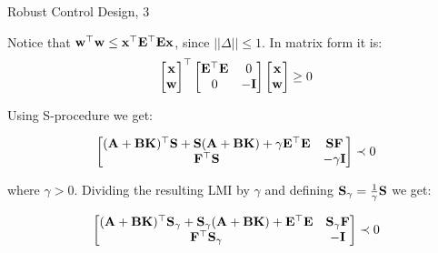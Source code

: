 \documentclass{beamer}
\begin{document}
\begin{frame}{Robust Control Design, 3}
	\begin{flushleft}
		
		
		Notice that $\mathbf{w}^\top\mathbf{w} \leq \mathbf{x}^\top \mathbf{E}^\top \mathbf{E} \mathbf{x}$, since $|| \Delta || \leq 1$. In matrix form it is:
		\begin{equation}
			\begin{bmatrix}
				\mathbf{x} \\ \mathbf{w}
			\end{bmatrix}^\top
			\begin{bmatrix}
				\mathbf{E}^\top \mathbf{E} & 0 \\
				0 & -\mathbf{I}
			\end{bmatrix}
			\begin{bmatrix}
				\mathbf{x} \\ \mathbf{w}
			\end{bmatrix} \geq 0
		\end{equation}
		
		Using S-procedure we get:
		
		\begin{equation}
			\begin{bmatrix}
				(\mathbf{A} + \mathbf{B}\mathbf{K})^\top\mathbf{S} + \mathbf{S} (\mathbf{A} + \mathbf{B}\mathbf{K}) + \gamma \mathbf{E}^\top \mathbf{E} & \mathbf{S}\mathbf{F} \\
				\mathbf{F}^\top\mathbf{S} & -\gamma\mathbf{I}
			\end{bmatrix} \prec 0
		\end{equation}		
		
		where $\gamma > 0$. Dividing the resulting LMI by $\gamma$ and defining $\mathbf{S}_\gamma = \frac{1}{\gamma}\mathbf{S}$ we get:
		
		\begin{equation}
			\begin{bmatrix}
				(\mathbf{A} + \mathbf{B}\mathbf{K})^\top\mathbf{S}_\gamma + \mathbf{S}_\gamma (\mathbf{A} + \mathbf{B}\mathbf{K}) + \mathbf{E}^\top \mathbf{E} & \mathbf{S}_\gamma\mathbf{F} \\
				\mathbf{F}^\top\mathbf{S}_\gamma & -\mathbf{I}
			\end{bmatrix} \prec 0
		\end{equation}
		
		
		
		
	\end{flushleft}
\end{frame}
\end{document}
